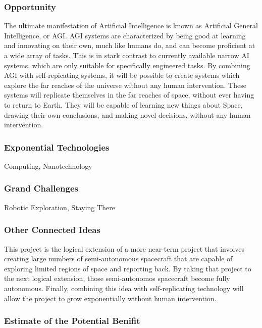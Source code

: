 \documentclass[english]{article}
\begin{document}
\subsubsection{Opportunity}

The ultimate manifestation of Artificial Intelligence is known as
Artificial General Intelligence, or AGI. AGI systems are characterized
by being good at learning and innovating on their own, much like humans
do, and can become proficient at a wide array of tasks. This is in
stark contrast to currently available narrow AI systems, which are
only suitable for specifically engineered tasks. By combining AGI
with self-repicating systems, it will be possible to create systems
which explore the far reaches of the universe without any human intervention.
These systems will replicate themselves in the far reaches of space,
without ever having to return to Earth. They will be capable of learning
new things about Space, drawing their own conclusions, and making
novel decisions, without any human intervention.


\subsubsection{Exponential Technologies}

Computing, Nanotechnology


\subsubsection{Grand Challenges}

Robotic Exploration, Staying There


\subsubsection{Other Connected Ideas}

This project is the logical extension of a more near-term project
that involves creating large numbers of semi-autonomous spacecraft
that are capable of exploring limited regions of space and reporting
back. By taking that project to the next logical extension, those
semi-autonomos spacecraft become fully autonomous. Finally, combining
this idea with self-replicating technology will allow the project
to grow exponentially without human intervention.


\subsubsection{Estimate of the Potential Benifit}
\end{document}
